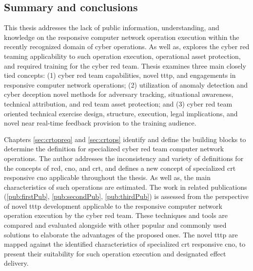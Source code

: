 \subsection{Summary and conclusions}
This thesis addresses the lack of public information, understanding, and knowledge on the responsive computer network operation execution within the recently recognized domain of cyber operations. As well as, explores the cyber red teaming applicability to such operation execution, operational asset protection, and required training for the cyber red team. Thesis examines three main closely tied concepts: (1) cyber red team capabilities, novel \gls{tttp}, and engagements in responsive computer network operations; (2) utilization of anomaly detection and cyber deception novel methods for adversary tracking, situational awareness, technical attribution, and red team asset protection; and (3) cyber red team oriented technical exercise design, structure, execution, legal implications, and novel near real-time feedback provision to the training audience.

Chapters \ref{sec:crtopreq} and \ref{sec:crtops} identify and define the building blocks to determine the definition for specialized cyber red team computer network operations. The author addresses the inconsistency and variety of definitions for the concepts of \gls{rcd}, \gls{cno}, and \gls{crt}, and defines a new concept of specialized \gls{crt} responsive \gls{cno} applicable throughout the thesis. As well as, the main characteristics of such operations are estimated. The work in related publications (\ref{pub:firstPub}, \ref{pub:secondPub}, \ref{pub:thirdPub}) is assessed from the perspective of novel \gls{tttp} development applicable to the responsive computer network operation execution by the cyber red team. These techniques and tools are compared and evaluated alongside with other popular and commonly used solutions to elaborate the advantages of the proposed ones. The novel \gls{tttp} are mapped against the identified characteristics of specialized \gls{crt} responsive \gls{cno}, to present their suitability for such operation execution and designated effect delivery.

